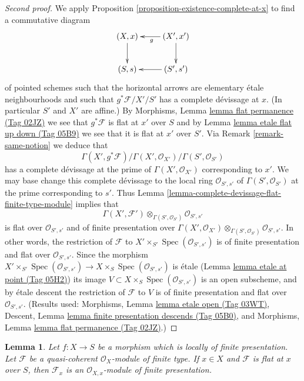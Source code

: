 \documentclass{amsart}
\theoremstyle{plain}
\newtheorem{lemma}[subsection]{Lemma}
\theoremstyle{definition}
\theoremstyle{remark}
\numberwithin{equation}{subsection}
\def\Spec{\mathop{\mathrm{Spec}}}
\begin{document}
\begin{proof}[Second proof]
We apply
Proposition \ref{proposition-existence-complete-at-x}
to find a commutative diagram
$$
\xymatrix{
(X, x) \ar[d] & (X', x') \ar[l]^g \ar[d] \\
(S, s) & (S', s') \ar[l]
}
$$
of pointed schemes such that the horizontal
arrows are elementary \'etale neighbourhoods
and such that $g^*\mathcal{F}/X'/S'$ has a complete
d\'evissage at $x$.
(In particular $S'$ and $X'$ are affine.) By
Morphisms, Lemma \href{https://stacks.math.columbia.edu/tag/02JZ}{lemma flat permanence (Tag 02JZ)}
we see that $g^*\mathcal{F}$ is flat at $x'$ over $S$ and by
Lemma \href{https://stacks.math.columbia.edu/tag/05B9}{lemma etale flat up down (Tag 05B9)}
we see that it is flat at $x'$ over $S'$. Via
Remark \ref{remark-same-notion}
we deduce that
$$
\Gamma(X', g^*\mathcal{F})/
\Gamma(X', \mathcal{O}_{X'})/
\Gamma(S', \mathcal{O}_{S'})
$$
has a complete d\'evissage at the prime of $\Gamma(X', \mathcal{O}_{X'})$
corresponding to $x'$. We may base change this complete
d\'evissage to the local ring $\mathcal{O}_{S', s'}$
of $\Gamma(S', \mathcal{O}_{S'})$ at the prime corresponding to
$s'$. Thus
Lemma \ref{lemma-complete-devissage-flat-finite-type-module}
implies that
$$
\Gamma(X', \mathcal{F}')
\otimes_{\Gamma(S', \mathcal{O}_{S'})}
\mathcal{O}_{S', s'}
$$
is flat over $\mathcal{O}_{S', s'}$ and of finite presentation over
$\Gamma(X', \mathcal{O}_{X'})
\otimes_{\Gamma(S', \mathcal{O}_{S'})} \mathcal{O}_{S', s'}$.
In other words, the restriction of $\mathcal{F}$ to
$X' \times_{S'} \Spec(\mathcal{O}_{S', s'})$
is of finite presentation and flat over $\mathcal{O}_{S', s'}$.
Since the morphism
$X' \times_{S'} \Spec(\mathcal{O}_{S', s'})
\to X \times_S \Spec(\mathcal{O}_{S', s'})$
is \'etale
(Lemma \href{https://stacks.math.columbia.edu/tag/05H2}{lemma etale at point (Tag 05H2)})
its image $V \subset X \times_S \Spec(\mathcal{O}_{S', s'})$
is an open subscheme, and by \'etale descent the restriction
of $\mathcal{F}$ to $V$ is of finite presentation and flat over
$\mathcal{O}_{S', s'}$. (Results used:
Morphisms, Lemma \href{https://stacks.math.columbia.edu/tag/03WT}{lemma etale open (Tag 03WT)},
Descent, Lemma \href{https://stacks.math.columbia.edu/tag/05B0}{lemma finite presentation descends (Tag 05B0)}, and
Morphisms, Lemma \href{https://stacks.math.columbia.edu/tag/02JZ}{lemma flat permanence (Tag 02JZ)}.)
\end{proof}


\begin{lemma}
\label{lemma-finite-type-flat-at-point-local}
Let $f : X \to S$ be a morphism which is locally of finite presentation.
Let $\mathcal{F}$ be a quasi-coherent $\mathcal{O}_X$-module of finite type.
If $x \in X$ and $\mathcal{F}$ is flat at $x$ over $S$, then
$\mathcal{F}_x$ is an $\mathcal{O}_{X, x}$-module of finite presentation.
\end{lemma}
\end{document}

